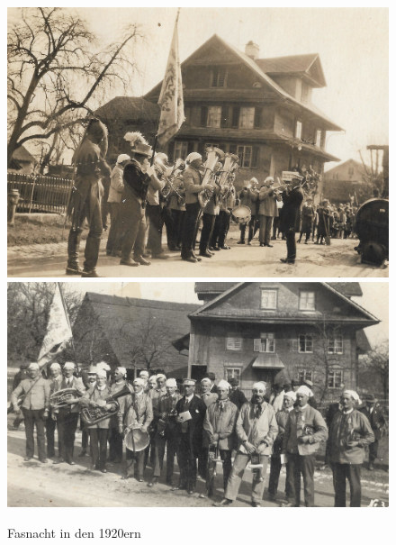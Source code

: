 \documentclass[openany]{book}
\begin{document}
\begin{figure}[h]
    \centerline{
        \includegraphics{./chap/1900-1925/Fasnacht-1920er-1.jpg}
        \includegraphics{./chap/1900-1925/Fasnacht-1920er-2.jpg}}
    \label{fig:mgh-fasnacht-1920}
    \caption{Fasnacht in den 1920ern}
\end{figure}
\clearpage
\end{document}
